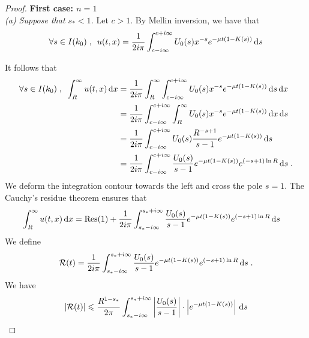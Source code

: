         \begin{proof}

            \textbf{First case: $ n = 1$} \\ 
            \textit{(a) Suppose that $s_* < 1$.} Let $c>1$. 
            By Mellin inversion, we have that
            \begin{align*}
                \forall s \in I(k_0)
                \; , \enspace
                u(t,x) = \frac{1}{2i\pi}\int_{c-i\infty}^{c+i\infty} U_0(s) x^{-s} e^{-\mu t(1 - K(s))} \,\mathrm{d} s
            \end{align*}
            
            It follows that
            \begin{align*}
                \forall s \in I(k_0)
                \; , \enspace
                \int_R^\infty u(t,x) \,\mathrm{d} x 
                &= \frac{1}{2i\pi} \int_R^\infty \int_{c-i\infty}^{c+i\infty} U_0(s) x^{-s} e^{-\mu t(1 - K(s))} \,\mathrm{d} s \,\mathrm{d} x \\
                &= \frac{1}{2i\pi} \int_{c-i\infty}^{c+i\infty} \int_R^\infty U_0(s) x^{-s} e^{-\mu t(1 - K(s))} \,\mathrm{d} x \,\mathrm{d} s \\
                &= \frac{1}{2i\pi} \int_{c-i\infty}^{c+i\infty} U_0(s) \frac{R^{-s+1}}{s-1} e^{-\mu t(1 - K(s))} \,\mathrm{d} s \\
                &= \frac{1}{2i\pi} \int_{c-i\infty}^{c+i\infty}\frac{U_0(s)}{s-1} e^{-\mu t(1 - K(s))} e^{(-s+1)\ln R} \,\mathrm{d} s 
                \; .
            \end{align*}
            We deform the integration contour towards the left and cross the pole $s = 1$. The Cauchy's residue theorem ensures that
            \begin{align}
                \int_R^\infty u(t,x) \,\mathrm{d} x &= \mathrm{Res(1)} + \frac{1}{2i\pi} \int_{s_*-i\infty}^{s_*+i\infty} \frac{U_0(s)}{s-1} e^{-\mu t(1 - K(s))} e^{(-s+1)\ln R} \,\mathrm{d} s
                \label{eq:cauchy1}
            \end{align}
            We define
            \begin{align*}
                \mathcal{R}(t) = \frac{1}{2i\pi} \int_{s_*-i\infty}^{s_*+i\infty} \frac{U_0(s)}{s-1} e^{-\mu t(1 - K(s))} e^{(-s+1)\ln R} \,\mathrm{d} s
                \; .
            \end{align*}
            We have 
            \begin{align*}
                |\Rcal(t)| 
                &\leq \frac{R^{1-s_*}}{2\pi} \int_{s_*-i\infty}^{s_*+i\infty} \left|\frac{U_0(s) }{s-1}\right| \cdot \left|e^{-\mu t(1 - K(s))}\right| \diff s \\

\end{align*}
\end{proof}

